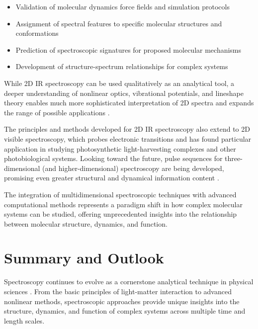 \begin{itemize}
	\item Validation of molecular dynamics force fields and simulation protocols
	\item Assignment of spectral features to specific molecular structures and conformations
	\item Prediction of spectroscopic signatures for proposed molecular mechanisms
	\item Development of structure-spectrum relationships for complex systems
\end{itemize}

\noindent While 2D IR spectroscopy can be used qualitatively as an analytical tool, a deeper understanding of nonlinear optics, vibrational potentials, and lineshape theory enables much more sophisticated interpretation of 2D spectra and expands the range of possible applications \cite{hammzanni2011conceptsmethods2d}.

\noindent The principles and methods developed for 2D IR spectroscopy also extend to 2D visible spectroscopy, which probes electronic transitions and has found particular application in studying photosynthetic light-harvesting complexes and other photobiological systems. Looking toward the future, pulse sequences for three-dimensional (and higher-dimensional) spectroscopy are being developed, promising even greater structural and dynamical information content \cite{hammzanni2011conceptsmethods2d}.

\noindent The integration of multidimensional spectroscopic techniques with advanced computational methods represents a paradigm shift in how complex molecular systems can be studied, offering unprecedented insights into the relationship between molecular structure, dynamics, and function.


\section{Summary and Outlook}
\label{sec:summary}

\noindent Spectroscopy continues to evolve as a cornerstone analytical technique in physical sciences \cite{mukamel1995principlesnonlinearoptical, cho2009twodimensionalopticalspectroscopy}. From the basic principles of light-matter interaction to advanced nonlinear methods, spectroscopic approaches provide unique insights into the structure, dynamics, and function of complex systems across multiple time and length scales.


